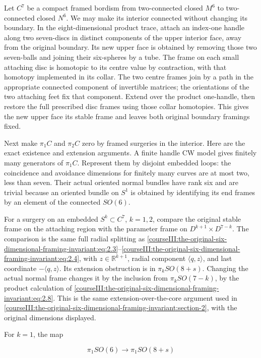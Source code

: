Let \(C^7\) be a compact framed bordism from two-connected closed \(M^6\) to two-connected closed \(N^6\). We may make its interior connected without changing its boundary. In the eight-dimensional product trace, attach an index-one handle along two seven-discs in distinct components of the upper interior face, away from the original boundary. Its new upper face is obtained by removing those two seven-balls and joining their six-spheres by a tube. The frame on each small attaching disc is homotopic to its centre value by contraction, with that homotopy implemented in its collar. The two centre frames join by a path in the appropriate connected component of invertible matrices; the orientations of the two attaching feet fix that component. Extend over the product one-handle, then restore the full prescribed disc frames using those collar homotopies. This gives the new upper face its stable frame and leaves both original boundary framings fixed.

Next make \(\pi_1C\) and \(\pi_2C\) zero by framed surgeries in the interior. Here are the exact existence and extension arguments. A finite handle CW model gives finitely many generators of \(\pi_1C\). Represent them by disjoint embedded loops: the coincidence and avoidance dimensions for finitely many curves are at most two, less than seven. Their actual oriented normal bundles have rank six and are trivial because an oriented bundle on \(S^1\) is obtained by identifying its end frames by an element of the connected \(SO(6)\).

For a surgery on an embedded \(S^k\subset C^7\), \(k=1,2\), compare the original stable frame on the attaching region with the parameter frame on \(D^{k+1}\times D^{7-k}\). The comparison is the same full radial splitting as \eqref{courseIII:the-original-six-dimensional-framing-invariant:eq:2.3}--\eqref{courseIII:the-original-six-dimensional-framing-invariant:eq:2.4}, with \(z\in\mathbb R^{k+1}\), radial component \(\langle q,z\rangle\), and last coordinate \(-\langle q,z\rangle\). Its extension obstruction is in \(\pi_kSO(8+s)\). Changing the actual normal frame changes it by the inclusion from \(\pi_kSO(7-k)\), by the product calculation of \eqref{courseIII:the-original-six-dimensional-framing-invariant:eq:2.8}. This is the same extension-over-the-core argument used in \cref{courseIII:the-original-six-dimensional-framing-invariant:section-2}, with the original dimensions displayed.

For \(k=1\), the map

\begin{equation}
\pi_1SO(6)\longrightarrow\pi_1SO(8+s)
 \label{courseIII:the-original-six-dimensional-framing-invariant:eq:8.8}
\end{equation}

